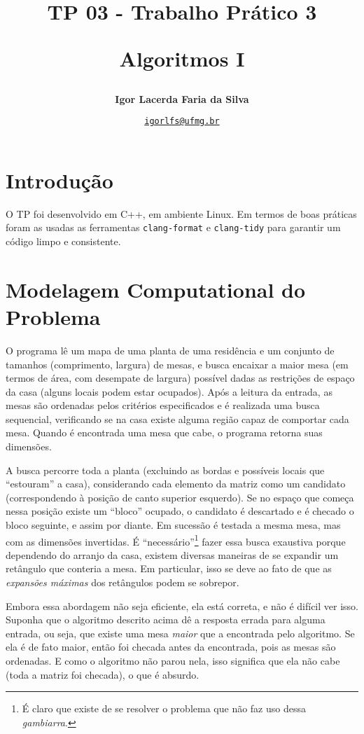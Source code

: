 \documentclass{article}
\author{\textbf{Igor Lacerda Faria da Silva}}
\title{{TP 03 - Trabalho Prático 3}

Algoritmos I}
\date{%
    \href{mailto:igorlfs@ufmg.br}{\nolinkurl{igorlfs@ufmg.br}}
}
\def\code#1{\texttt{#1}}
\begin{document}
\maketitle

\section{Introdução}

O TP foi desenvolvido em C++, em ambiente Linux. Em termos de boas práticas foram as usadas as ferramentas \code{clang-format} e \code{clang-tidy} para garantir um código limpo e consistente.

\section{Modelagem Computational do Problema}

O programa lê um mapa de uma planta de uma residência e um conjunto de tamanhos (comprimento, largura) de mesas, e busca encaixar a maior mesa (em termos de área, com desempate de largura) possível dadas as restrições de espaço da casa (alguns locais podem estar ocupados). Após a leitura da entrada, as mesas são ordenadas pelos critérios especificados e é realizada uma busca sequencial, verificando se na casa existe alguma região capaz de comportar cada mesa. Quando é encontrada uma mesa que cabe, o programa retorna suas dimensões.

A busca percorre toda a planta (excluindo as bordas e possíveis locais que ``estouram'' a casa), considerando cada elemento da matriz como um candidato (correspondendo à posição de canto superior esquerdo). Se no espaço que começa nessa posição existe um ``bloco'' ocupado, o candidato é descartado e é checado o bloco seguinte, e assim por diante. Em sucessão é testada a mesma mesa, mas com as dimensões invertidas. É ``necessário''\footnote{É claro que existe de se resolver o problema que não faz uso dessa \textit{gambiarra}.} fazer essa busca exaustiva porque dependendo do arranjo da casa, existem diversas maneiras de se expandir um retângulo que conteria a mesa. Em particular, isso se deve ao fato de que as \textit{expansões máximas} dos retângulos podem se sobrepor.

Embora essa abordagem não seja eficiente, ela está correta, e não é difícil ver isso. Suponha que o algoritmo descrito acima dê a resposta errada para alguma entrada, ou seja, que existe uma mesa \textit{maior} que a encontrada pelo algoritmo. Se ela é de fato maior, então foi checada antes da encontrada, pois as mesas são ordenadas. E como o algoritmo não parou nela, isso significa que ela não cabe (toda a matriz foi checada), o que é absurdo.
\end{document}

